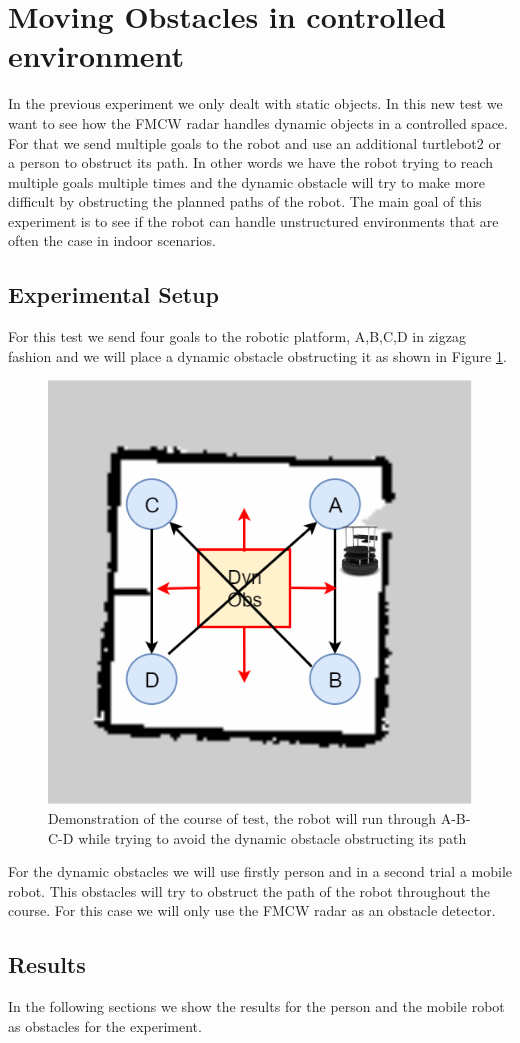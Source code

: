 \section{Moving Obstacles in controlled environment}
In the previous experiment we only dealt with static objects. In this new test we want to see how the \ac{FMCW} \ac{radar} handles dynamic objects in a controlled space. For that we send multiple goals  to the robot and use an additional turtlebot2 or a person to obstruct its path. In other words we have the robot trying to reach multiple goals multiple times and the dynamic obstacle will try to make more difficult by obstructing the planned paths of the robot.  The main goal of this experiment is to see if the robot can handle unstructured environments that are often the case in indoor scenarios.
\subsection{Experimental Setup}
For this test we send four goals to the robotic platform, A,B,C,D in zigzag fashion and we will place a dynamic obstacle obstructing it as shown in Figure \ref{fig:exp3}.

\begin{figure}[ht!]
\centerline{\includegraphics [width=0.5 \textwidth]{imgs/chapter5/exp6.png}}
\caption[Demonstration of the course of test]{Demonstration of the course of test, the robot will run through A-B-C-D  while  trying to avoid the dynamic obstacle obstructing its path}
\label{fig:exp3}
\end{figure}
For the dynamic obstacles we will use firstly person and in a second trial a mobile robot. This obstacles will try to obstruct the path of the robot throughout the course. For this case we will only use the \ac{FMCW} \ac{radar} as an obstacle detector.


\subsection{Results}
In the following sections we show the results for the person and the mobile robot as obstacles for the experiment.
